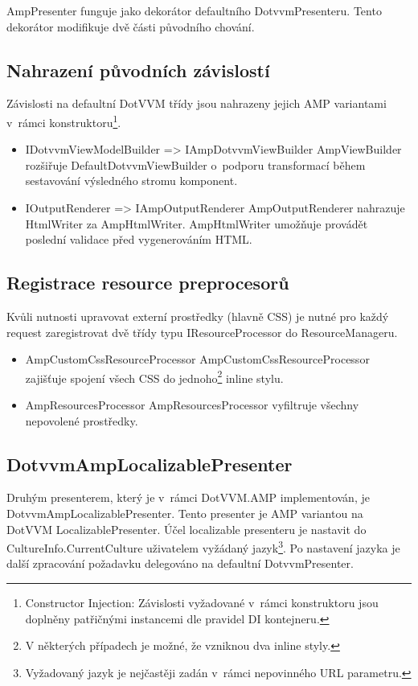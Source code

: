 AmpPresenter funguje jako dekorátor defaultního DotvvmPresenteru. Tento dekorátor modifikuje dvě části původního chování.

\subsection*{Nahrazení původních závislostí}
Závislosti na defaultní DotVVM třídy jsou nahrazeny jejich AMP variantami v~rámci konstruktoru\footnote{Constructor Injection: Závislosti vyžadované v~rámci konstruktoru jsou doplněny patřičnými instancemi dle pravidel DI kontejneru.}.

\begin{itemize}
    \item IDotvvmViewModelBuilder => IAmpDotvvmViewBuilder \newline
    AmpViewBuilder rozšiřuje DefaultDotvvmViewBuilder o~podporu transformací během sestavování výsledného stromu komponent.
    \item IOutputRenderer => IAmpOutputRenderer \newline
    AmpOutputRenderer nahrazuje HtmlWriter za AmpHtmlWriter. AmpHtmlWriter umožňuje provádět poslední validace před vygenerováním HTML.
\end{itemize}

\subsection*{Registrace resource preprocesorů}
Kvůli nutnosti upravovat externí prostředky (hlavně CSS) je nutné pro každý request zaregistrovat dvě třídy typu IResourceProcessor do ResourceManageru.
\begin{itemize}
    \item AmpCustomCssResourceProcessor \newline
    AmpCustomCssResourceProcessor zajišťuje spojení všech CSS do jednoho\footnote{V některých případech je možné, že vzniknou dva inline styly.} inline stylu.
    \item AmpResourcesProcessor \newline
    AmpResourcesProcessor vyfiltruje všechny nepovolené prostředky.
\end{itemize}

\subsection*{DotvvmAmpLocalizablePresenter}
Druhým presenterem, který je v~rámci DotVVM.AMP implementován, je DotvvmAmpLocalizablePresenter. Tento presenter je AMP variantou na DotVVM LocalizablePresenter.
Účel localizable presenteru je nastavit do  CultureInfo.CurrentCulture uživatelem vyžádaný jazyk\footnote{Vyžadovaný jazyk je nejčastěji zadán v~rámci nepovinného URL parametru.}. Po nastavení jazyka je další zpracování požadavku delegováno na defaultní DotvvmPresenter.

